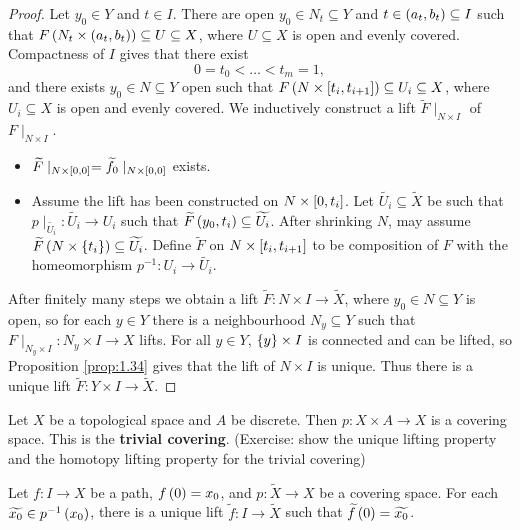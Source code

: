 \begin{proof}
Let $ y_0 \in Y $ and $ t \in I $. There are open $ y_0 \in N_t \subseteq Y $ and $ t \in \rb{a_t, b_t} \subseteq I $ such that $ F\rb{N_t \times \rb{a_t, b_t}} \subseteq U \subseteq X $, where $ U \subseteq X $ is open and evenly covered. Compactness of $ I $ gives that there exist
$$ 0 = t_0 < \dots < t_m = 1, $$
and there exists $ y_0 \in N \subseteq Y $ open such that $ F\rb{N \times \sb{t_i, t_{i + 1}}} \subseteq U_i \subseteq X $, where $ U_i \subseteq X $ is open and evenly covered. We inductively construct a lift $ \widetilde{F} \mid_{N \times I} $ of $ F \mid_{N \times I} $.
\begin{itemize}
\item $ \widetilde{F} \mid_{N \times \sb{0, 0}} = \widetilde{f_0} \mid_{N \times \sb{0, 0}} $ exists.
\item Assume the lift has been constructed on $ N \times \sb{0, t_i} $. Let $ \widetilde{U_i} \subseteq \widetilde{X} $ be such that $ p \mid_{\widetilde{U_i}} : \widetilde{U_i} \to U_i $ such that $ \widetilde{F}\rb{y_0, t_i} \subseteq \widetilde{U_i} $. After shrinking $ N $, may assume $ \widetilde{F}\rb{N \times \cb{t_i}} \subseteq \widetilde{U_i} $. Define $ \widetilde{F} $ on $ N \times \sb{t_i, t_{i + 1}} $ to be composition of $ F $ with the homeomorphism $ p^{-1} : U_i \to \widetilde{U_i} $.
\end{itemize}
After finitely many steps we obtain a lift $ \widetilde{F} : N \times I \to \widetilde{X} $, where $ y_0 \in N \subseteq Y $ is open, so for each $ y \in Y $ there is a neighbourhood $ N_y \subseteq Y $ such that $ F \mid_{N_y \times I} : N_y \times I \to X $ lifts. For all $ y \in Y $, $ \cb{y} \times I $ is connected and can be lifted, so Proposition \ref{prop:1.34} gives that the lift of $ N \times I $ is unique. Thus there is a unique lift $ \widetilde{F} : Y \times I \to \widetilde{X} $.
\end{proof}

\begin{example*}
Let $ X $ be a topological space and $ A $ be discrete. Then $ p : X \times A \to X $ is a covering space. This is the \textbf{trivial covering}. (Exercise: show the unique lifting property and the homotopy lifting property for the trivial covering)
\end{example*}

\begin{corollary}
Let $ f : I \to X $ be a path, $ f\rb{0} = x_0 $, and $ p : \widetilde{X} \to X $ be a covering space. For each $ \widetilde{x_0} \in p^{-1}\rb{x_0} $, there is a unique lift $ \widetilde{f} : I \to \widetilde{X} $ such that $ \widetilde{f}\rb{0} = \widetilde{x_0} $.
\end{corollary}

